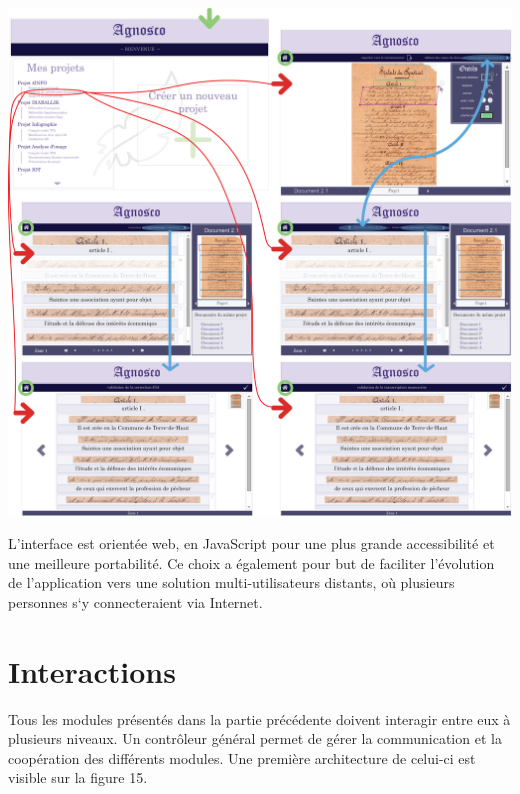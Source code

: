 \paragraph{}
\begin{mdframed}[frametitle={Figure 15 : Hiérarchie entre les pages}, innerbottommargin=10]
\begin{center}
\includegraphics[scale=0.6]{ihm6.png}
\end{center}
\end{mdframed}

L’interface est orientée web, en JavaScript pour une plus grande accessibilité 
et une meilleure portabilité. Ce choix a également pour but de faciliter 
l’évolution de l’application vers une solution multi-utilisateurs distants, 
où plusieurs personnes s‘y connecteraient via Internet.

\section{Interactions}

Tous les modules présentés dans la partie précédente doivent interagir entre
eux à plusieurs niveaux. Un contrôleur général permet de gérer la communication
et la coopération des différents modules. Une première architecture de celui-ci
est visible sur la figure 15.

